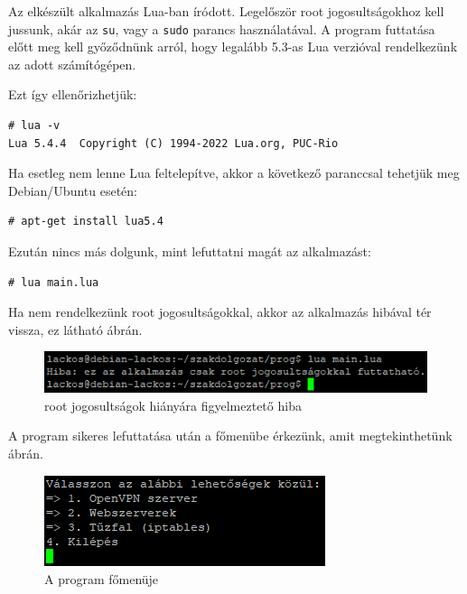 
Az elkészült alkalmazás Lua-ban íródott. Legelőször root jogosultságokhoz kell jussunk, akár az \texttt{su}, vagy a \texttt{sudo} parancs használatával. A program futtatása előtt meg kell győződnünk arról, hogy legalább 5.3-as Lua verzióval rendelkezünk az adott számítógépen. 

Ezt így ellenőrizhetjük:
\begin{verbatim}
# lua -v
Lua 5.4.4  Copyright (C) 1994-2022 Lua.org, PUC-Rio
\end{verbatim}

Ha esetleg nem lenne Lua feltelepítve, akkor a következő paranccsal tehetjük meg Debian/Ubuntu esetén:

\begin{verbatim}
# apt-get install lua5.4
\end{verbatim}

Ezután nincs más dolgunk, mint lefuttatni magát az alkalmazást:

\begin{verbatim}
# lua main.lua
\end{verbatim}

Ha nem rendelkezünk root jogosultságokkal, akkor az alkalmazás hibával tér vissza, ez látható  ábrán.

\begin{figure}[h]
\centering
\includegraphics[scale=1]{images/root_required.png}
\caption{root jogosultságok hiányára figyelmeztető hiba}
\label{fig:root_required}
\end{figure}

A program sikeres lefuttatása után a főmenübe érkezünk, amit megtekinthetünk  ábrán.

\begin{figure}[h]
\centering
\includegraphics[scale=1]{images/main_menu.png}
\caption{A program főmenüje}
\label{fig:main_menu}
\end{figure}

